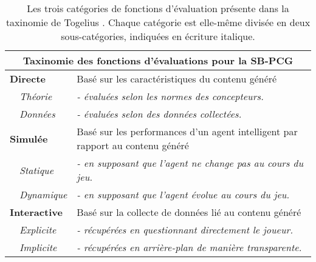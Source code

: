 \documentclass[a4paper,11pt]{article}
\begin{document}
      \begin{table}
        \begin{tabularx}{\linewidth}{p{2.2cm} X}
          \hline
            \multicolumn{2}{c}{\textbf{Taxinomie des fonctions d'évaluations pour la SB-PCG}} \\
          \hline
            \textbf{Directe} & Basé sur les caractéristiques du contenu généré \\
            ~~\textit{Théorie} & \textit{- évaluées selon les normes des concepteurs.} \\ 
            ~~\textit{Données} & \textit{- évaluées selon des données collectées.} \\
          \hline
            \textbf{Simulée} & Basé sur les performances d'un agent intelligent par rapport au contenu généré \\
            ~~\textit{Statique} & \textit{- en supposant que l'agent ne change pas au cours du jeu.} \\
            ~~\textit{Dynamique} & \textit{- en supposant que l'agent évolue au cours du jeu.} \\
          \hline
            \textbf{Interactive} & Basé sur la collecte de données lié au contenu généré \\
            ~~\textit{Explicite} & \textit{- récupérées en questionnant directement le joueur.} \\
            ~~\textit{Implicite} & \textit{- récupérées en arrière-plan de manière transparente.} \\
          \hline
        \end{tabularx}
        \caption{Les trois catégories de fonctions d'évaluation présente dans la taxinomie de Togelius \cite{Togelius}. Chaque catégorie est elle-même divisée en deux sous-catégories, indiquées en écriture italique.}
        \label{table:fitness-functions}
      \end{table}
        
\end{document}
